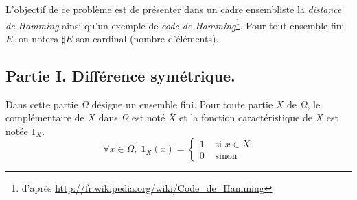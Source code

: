 L'objectif de ce problème est de présenter dans un cadre ensembliste la \emph{distance de Hamming} ainsi qu'un exemple de \emph{code de Hamming}\footnote{d'après \href{http://fr.wikipedia.org/wiki/Code\_de\_Hamming}{http://fr.wikipedia.org/wiki/Code\_de\_Hamming}}.\newline
Pour tout ensemble fini $E$, on notera $\sharp E$ son cardinal (nombre d'éléments).
\subsection*{Partie I. Différence symétrique.}
Dans cette partie $\Omega$ désigne un ensemble fini. Pour toute partie $X$ de $\Omega$, le complémentaire de $X$ dans $\Omega$ est noté $\overline{X}$ et la fonction caractéristique de $X$ est notée $1_X$.
\begin{displaymath}
\forall x \in \Omega, \;  1_X(x) =  
\left\lbrace 
\begin{aligned}
1& \text{ si } x \in X \\ 0& \text{ sinon }
\end{aligned}
\right. 
\end{displaymath}

